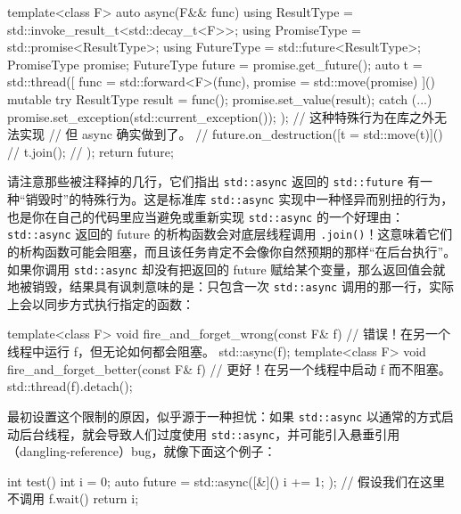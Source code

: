 \begin{codebox}[cpp]
    template<class F>
    auto async(F&& func) {
      using ResultType = std::invoke_result_t<std::decay_t<F>>;
      using PromiseType = std::promise<ResultType>;
      using FutureType = std::future<ResultType>;
      PromiseType promise;
      FutureType future = promise.get_future();
      auto t = std::thread([
        func = std::forward<F>(func),
        promise = std::move(promise)
      ]() mutable {
        try {
          ResultType result = func();
           promise.set_value(result);
        } catch (...) {
          promise.set_exception(std::current_exception());
        }
      });
      // 这种特殊行为在库之外无法实现
      // 但 async 确实做到了。
      // future.on_destruction([t = std::move(t)]() {
      //  t.join();
      // });
      return future;
    }
\end{codebox}

请注意那些被注释掉的几行，它们指出 \texttt{std::\allowbreak{}async} 返回的 \texttt{std::\allowbreak{}future} 有一种“销毁时”的特殊行为。这是标准库 \texttt{std::\allowbreak{}async} 实现中一种怪异而别扭的行为，也是你在自己的代码里应当避免或重新实现 \texttt{std::\allowbreak{}async} 的一个好理由：\texttt{std::\allowbreak{}async} 返回的 future 的析构函数会对底层线程调用 \texttt{.join(\allowbreak{})\allowbreak{}}！这意味着它们的析构函数可能会阻塞，而且该任务肯定不会像你自然预期的那样“在后台执行”。如果你调用 \texttt{std::\allowbreak{}async} 却没有把返回的 future 赋给某个变量，那么返回值会就地被销毁，结果具有讽刺意味的是：只包含一次 \texttt{std::\allowbreak{}async} 调用的那一行，实际上会以同步方式执行指定的函数：

\begin{codebox}[cpp]
    template<class F>
    void fire_and_forget_wrong(const F& f) {
      // 错误！在另一个线程中运行 f，但无论如何都会阻塞。
      std::async(f);
    }
    template<class F>
    void fire_and_forget_better(const F& f) {
      // 更好！在另一个线程中启动 f 而不阻塞。
      std::thread(f).detach();
    }
\end{codebox}

最初设置这个限制的原因，似乎源于一种担忧：如果 \texttt{std::\allowbreak{}async} 以通常的方式启动后台线程，就会导致人们过度使用 \texttt{std::\allowbreak{}async}，并可能引入悬垂引用（dangling-reference）bug，就像下面这个例子：

\begin{codebox}[cpp]
    int test() {
      int i = 0;
      auto future = std::async([&]() {
        i += 1;
      });
      // 假设我们在这里不调用 f.wait()
      return i;
    }
\end{codebox}

